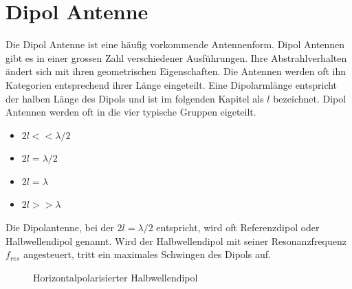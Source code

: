 \section{Dipol Antenne}
Die Dipol Antenne ist eine häufig vorkommende Antennenform. Dipol Antennen gibt es in einer grossen Zahl verschiedener Ausführungen. Ihre Abstrahlverhalten ändert sich mit ihren geometrischen Eigenschaften. Die Antennen werden oft ihn Kategorien entsprechend ihrer Länge eingeteilt. Eine Dipolarmlänge entspricht der halben Länge des Dipols und ist im folgenden Kapitel als $l$ bezeichnet. Dipol Antennen werden oft in die vier typische Gruppen eigeteilt. 
\begin{itemize}
\item $2l<< \lambda/2 $
\item $2l = \lambda/2 $
\item $2l = \lambda $
\item $2l>> \lambda $
\end{itemize} 
Die Dipolantenne, bei der $2l=\lambda/2$ entspricht, wird oft Referenzdipol oder Halbwellendipol genannt. Wird der Halbwellendipol mit seiner Resonanzfrequenz $f_{res}$ angesteuert, tritt ein maximales Schwingen des Dipols auf. 

\begin{figure}[!ht]%
	\begin{center}
	\end{center}
\caption{Horizontalpolarisierter Halbwellendipol}
\label{fig:HalbWellenDipolHorizontal}
\end{figure}

